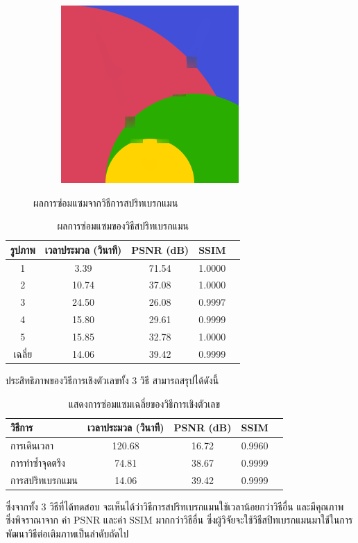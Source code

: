\documentclass[hidelinks, a4paper,12pt]{article}
\numberwithin{equation}{section}							%
\numberwithin{equation}{section}
\begin{document}
{\begin{figure}[H]
\begin{subfigure}{0.4\linewidth}
		\includegraphics[width=0.8\linewidth]{images/result_ex1/splitbergman05.png}			
	\end{subfigure}
	\caption{ผลการซ่อมแซมจากวิธีการสปริทเบรกแมน}
\end{figure}
\begin{table}[H]
	\centering
	\begin{tabular}[ht]{|c|c|c|c|c|}
		\hline
		รูปภาพ &เวลาประมวล  (วินาที) & PSNR (dB) & SSIM \\
		\hline
		1 & 3.39 & 71.54 & 1.0000 \\ 
		2 & 10.74 & 37.08 & 1.0000 \\
		3 &  24.50 & 26.08 & 0.9997 \\
		4 & 15.80  & 29.61  & 0.9999 \\
		5 & 15.85  & 32.78  & 1.0000 \\
		\hline
		เฉลี่ย & 14.06  & 39.42  & 0.9999 \\
		\hline
	\end{tabular}
	\caption{ผลการซ่อมแซมของวิธีสปริทเบรกแมน}
\end{table}
	ประสิทธิภาพของวิธีการเชิงตัวเลขทั้ง 3 วิธี สามารถสรุปได้ดังนี้
	\begin{table}[H]
		\centering
		\begin{tabular}[ht]{|l|c|c|c|c|}
			\hline
			วิธีการ  & เวลาประมวล  (วินาที) & PSNR (dB) & SSIM \\
			\hline
			การเดินเวลา & 120.68 & 16.72 & 0.9960 \\
			การทำซ้ำจุดตรึง & 74.81 & 38.67 & 0.9999 \\
			การสปริทเบรกแมน & 14.06 & 39.42 & 0.9999  \\
			\hline
		\end{tabular}
		\caption{แสดงการซ่อมแซมเฉลี่ยของวิธีการเชิงตัวเลข}
	\end{table}	
	\hspace{1cm} 
	ซึ่งจากทั้ง 3 วิธีที่ได้ทดสอบ จะเห็นได้ว่าวิธีการสปริทเบรกแมนใช้เวลาน้อยกว่าวิธีอื่น และมีคุณภาพ ซึ่งพิจราณาจาก ค่า PSNR และค่า SSIM มากกว่าวิธีอื่น ซึ่งผู้วิจัยจะใช้วิธีสปิทเบรกแมนมาใช้ในการพัฒนาวิธีต่อเติมภาพเป็นลำดับถัดไป
	
}
\end{document}
